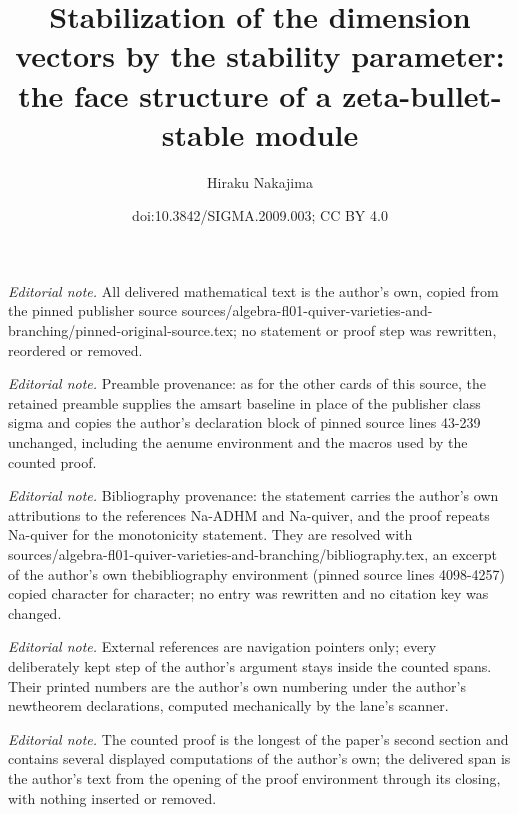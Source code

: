 \documentclass[10pt,a4paper]{amsart}
\title{Stabilization of the dimension vectors by the stability parameter: the face structure of a zeta-bullet-stable module}
\author{Hiraku Nakajima}
\date{doi:10.3842/SIGMA.2009.003; CC BY 4.0}
\theoremstyle{definition}
\numberwithin{equation}{section}
\begin{document}
\maketitle
\noindent\textit{Editorial note.} All delivered mathematical text is the author's own, copied from the pinned publisher source sources/algebra-fl01-quiver-varieties-and-branching/pinned-original-source.tex; no statement or proof step was rewritten, reordered or removed.\par\medskip
\noindent\textit{Editorial note.} Preamble provenance: as for the other cards of this source, the retained preamble supplies the amsart baseline in place of the publisher class sigma and copies the author's declaration block of pinned source lines 43-239 unchanged, including the aenume environment and the macros used by the counted proof.\par\medskip
\noindent\textit{Editorial note.} Bibliography provenance: the statement carries the author's own attributions to the references Na-ADHM and Na-quiver, and the proof repeats Na-quiver for the monotonicity statement. They are resolved with sources/algebra-fl01-quiver-varieties-and-branching/bibliography.tex, an excerpt of the author's own thebibliography environment (pinned source lines 4098-4257) copied character for character; no entry was rewritten and no citation key was changed.\par\medskip
\noindent\textit{Editorial note.} External references are navigation pointers only; every deliberately kept step of the author's argument stays inside the counted spans. Their printed numbers are the author's own numbering under the author's newtheorem declarations, computed mechanically by the lane's scanner.\par\medskip
\noindent\textit{Editorial note.} The counted proof is the longest of the paper's second section and contains several displayed computations of the author's own; the delivered span is the author's text from the opening of the proof environment through its closing, with nothing inserted or removed.\par\medskip
\end{document}
